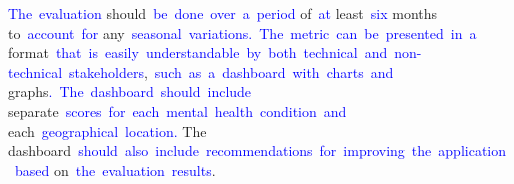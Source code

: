 \begin{tcolorbox}[colframe=gray!70!black,colback=white, title=Sample 6]
{}\textcolor{blue}{The}\textcolor{blue}{~evaluation} should\textcolor{blue}{~be}\textcolor{blue}{~done}\textcolor{blue}{~over}\textcolor{blue}{~a}\textcolor{blue}{~period} of\textcolor{blue}{~at} least\textcolor{blue}{~six} months to\textcolor{blue}{~account}\textcolor{blue}{~for} any\textcolor{blue}{~seasonal}\textcolor{blue}{~variations}\textcolor{blue}{.}\textcolor{blue}{~The}\textcolor{blue}{~metric}\textcolor{blue}{~can}\textcolor{blue}{~be}\textcolor{blue}{~presented}\textcolor{blue}{~in}\textcolor{blue}{~a} format\textcolor{blue}{~that}\textcolor{blue}{~is}\textcolor{blue}{~easily}\textcolor{blue}{~understandable}\textcolor{blue}{~by}\textcolor{blue}{~both}\textcolor{blue}{~technical}\textcolor{blue}{~and}\textcolor{blue}{~non}\textcolor{blue}{-}\textcolor{blue}{technical}\textcolor{blue}{~stakeholders},\textcolor{blue}{~such}\textcolor{blue}{~as}\textcolor{blue}{~a}\textcolor{blue}{~dashboard}\textcolor{blue}{~with}\textcolor{blue}{~charts}\textcolor{blue}{~and} graphs\textcolor{blue}{.}\textcolor{blue}{~The}\textcolor{blue}{~dashboard}\textcolor{blue}{~should}\textcolor{blue}{~include} separate\textcolor{blue}{~scores}\textcolor{blue}{~for}\textcolor{blue}{~each}\textcolor{blue}{~mental}\textcolor{blue}{~health}\textcolor{blue}{~condition}\textcolor{blue}{~and} each\textcolor{blue}{~geographical}\textcolor{blue}{~location}\textcolor{blue}{.} The dashboard\textcolor{blue}{~should}\textcolor{blue}{~also}\textcolor{blue}{~include}\textcolor{blue}{~recommendations}\textcolor{blue}{~for}\textcolor{blue}{~improving}\textcolor{blue}{~the}\textcolor{blue}{~application}\textcolor{blue}{~based} on\textcolor{blue}{~the}\textcolor{blue}{~evaluation}\textcolor{blue}{~results}.\textcolor{blue}{}
\end{tcolorbox}



    




    
    

















